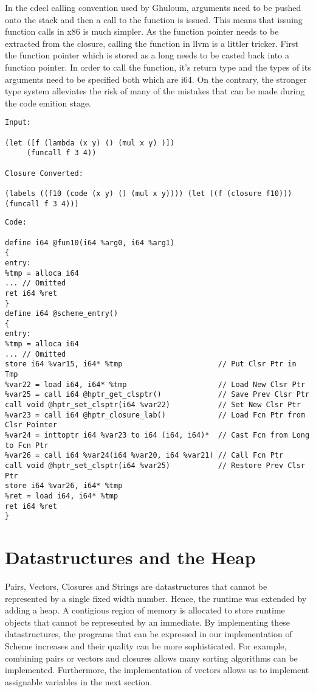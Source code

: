 \documentclass{article}
\begin{document}
In the cdecl calling convention used by Ghuloum, arguments need to be pushed onto the stack and then a call to the function is issued. This means that issuing function calls in x86 is much simpler. As the function pointer needs to be extracted from the closure, calling the function in llvm is a littler tricker. First the function pointer which is stored as a long needs to be casted back into a function pointer. In order to call the function, it's return type and the types of its arguments need to be specified both which are i64. On the contrary, the stronger type system alleviates the risk of many of the mistakes that can be made during the code emition stage. 

\begin{verbatim}
Input:

(let ([f (lambda (x y) () (mul x y) )])
     (funcall f 3 4))

Closure Converted:

(labels ((f10 (code (x y) () (mul x y)))) (let ((f (closure f10))) (funcall f 3 4)))

\end{verbatim}

\begin{verbatim}
Code:

define i64 @fun10(i64 %arg0, i64 %arg1)
{
entry: 
%tmp = alloca i64
... // Omitted
ret i64 %ret
}
define i64 @scheme_entry()
{
entry: 
%tmp = alloca i64
... // Omitted
store i64 %var15, i64* %tmp                      // Put Clsr Ptr in Tmp
%var22 = load i64, i64* %tmp                     // Load New Clsr Ptr
%var25 = call i64 @hptr_get_clsptr()             // Save Prev Clsr Ptr
call void @hptr_set_clsptr(i64 %var22)           // Set New Clsr Ptr
%var23 = call i64 @hptr_closure_lab()            // Load Fcn Ptr from Clsr Pointer
%var24 = inttoptr i64 %var23 to i64 (i64, i64)*  // Cast Fcn from Long to Fcn Ptr
%var26 = call i64 %var24(i64 %var20, i64 %var21) // Call Fcn Ptr
call void @hptr_set_clsptr(i64 %var25)           // Restore Prev Clsr Ptr
store i64 %var26, i64* %tmp
%ret = load i64, i64* %tmp
ret i64 %ret
}
\end{verbatim}


\section{Datastructures and the Heap}

Pairs, Vectors, Closures and Strings are datastructures that cannot be represented by a single fixed width number. Hence, the runtime was extended by adding a heap. A contigious region of memory is allocated to store runtime objects that cannot be represented by an immediate. By implementing these datastructures, the programs that can be expressed in our implementation of Scheme increases and their quality can be more sophisticated. For example, combining pairs or vectors and closures allows many sorting algorithms can be implemented. Furthermore, the implementation of vectors allows us to implement assignable variables in the next section.
\end{document}

